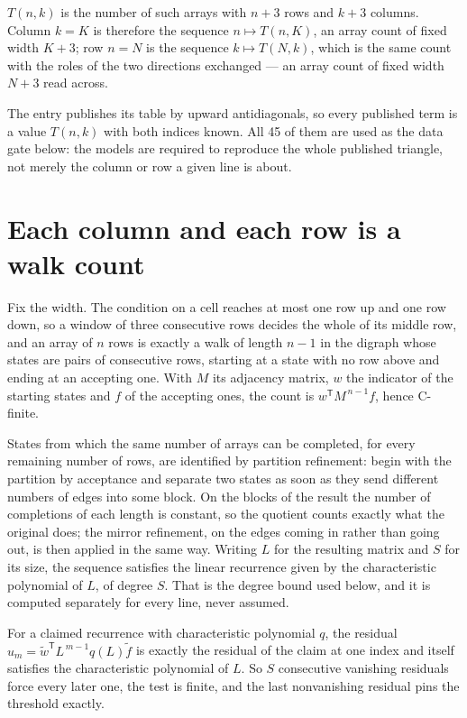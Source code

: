 \documentclass[11pt]{article}
\theoremstyle{definition}
\begin{document}
$T(n,k)$ is the number of such arrays with $n + 3$ rows and $k + 3$ columns. Column $k = K$ is therefore the sequence $n \mapsto T(n,K)$, an array count of fixed width $K + 3$; row $n = N$ is the sequence $k \mapsto T(N,k)$, which is the same count with the roles of the two directions exchanged --- an array count of fixed width $N + 3$ read across.

The entry publishes its table by upward antidiagonals, so every published term is a value $T(n,k)$ with both indices known. All 45 of them are used as the data gate below: the models are required to reproduce the whole published triangle, not merely the column or row a given line is about.

\section{Each column and each row is a walk count}

Fix the width. The condition on a cell reaches at most one row up and one row down, so a window of three consecutive rows decides the whole of its middle row, and an array of $n$ rows is exactly a walk of length $n-1$ in the digraph whose states are pairs of consecutive rows, starting at a state with no row above and ending at an accepting one. With $M$ its adjacency matrix, $w$ the indicator of the starting states and $f$ of the accepting ones, the count is $w^{\mathsf T}M^{\,n-1}f$, hence C-finite.

States from which the same number of arrays can be completed, for every remaining number of rows, are identified by partition refinement: begin with the partition by acceptance and separate two states as soon as they send different numbers of edges into some block. On the blocks of the result the number of completions of each length is constant, so the quotient counts exactly what the original does; the mirror refinement, on the edges coming in rather than going out, is then applied in the same way. Writing $L$ for the resulting matrix and $S$ for its size, the sequence satisfies the linear recurrence given by the characteristic polynomial of $L$, of degree $S$. That is the degree bound used below, and it is computed separately for every line, never assumed.

For a claimed recurrence with characteristic polynomial $q$, the residual $u_m = \tilde w^{\mathsf T}L^{\,m-1}q(L)\tilde f$ is exactly the residual of the claim at one index and itself satisfies the characteristic polynomial of $L$. So $S$ consecutive vanishing residuals force every later one, the test is finite, and the last nonvanishing residual pins the threshold exactly.
\end{document}
